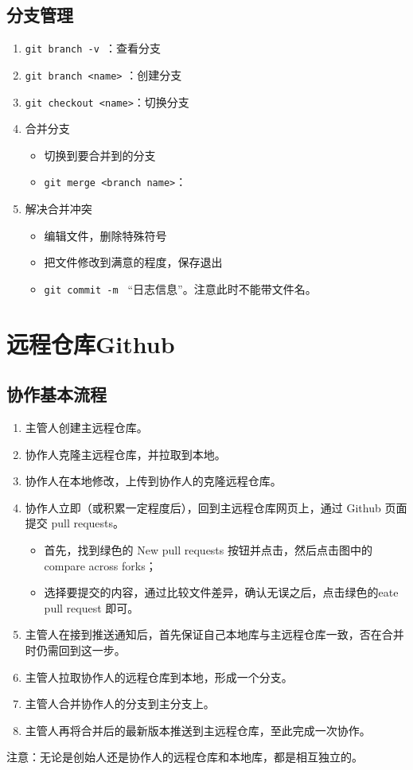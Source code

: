 \subsection{分支管理}
\begin{enumerate}
\item \verb|git branch -v |：查看分支
\item \verb|git branch <name>| ：创建分支
\item \verb|git checkout <name>|：切换分支
\item 合并分支
\begin{itemize}
\item 切换到要合并到的分支
\item \verb|git merge <branch name>|：
\end{itemize}
\item 解决合并冲突
\begin{itemize}
\item  编辑文件，删除特殊符号
\item 把文件修改到满意的程度，保存退出
\item \verb|git commit -m | ``日志信息''。注意此时不能带文件名。
\end{itemize}
\end{enumerate}



\section{远程仓库Github}
\subsection{协作基本流程}
\begin{enumerate}
\item  主管人创建主远程仓库。
\item 协作人克隆主远程仓库，并拉取到本地。
\item 协作人在本地修改，上传到协作人的克隆远程仓库。
\item 协作人立即（或积累一定程度后），回到主远程仓库网页上，通过 Github 页面提交 pull requests。
\begin{itemize}
\item 首先，找到绿色的 New pull requests 按钮并点击，然后点击图中的 compare across forks；
\item 选择要提交的内容，通过比较文件差异，确认无误之后，点击绿色的eate pull request 即可。
\end{itemize}
\item 主管人在接到推送通知后，首先保证自己本地库与主远程仓库一致，否在合并时仍需回到这一步。
\item 主管人拉取协作人的远程仓库到本地，形成一个分支。
\item 主管人合并协作人的分支到主分支上。
\item 主管人再将合并后的最新版本推送到主远程仓库，至此完成一次协作。
\end{enumerate}
注意：无论是创始人还是协作人的远程仓库和本地库，都是相互独立的。


